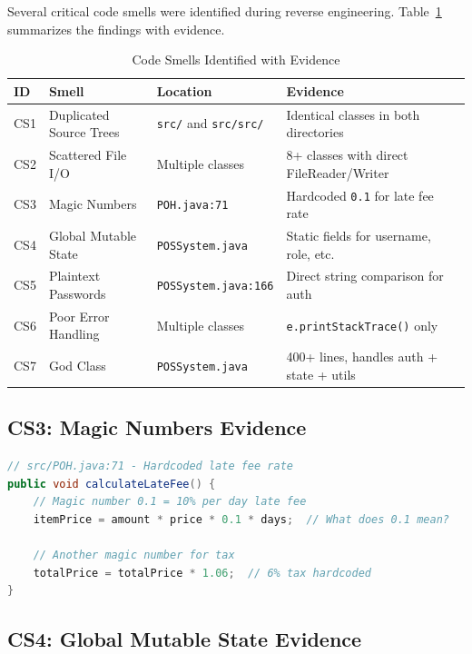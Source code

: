Several critical code smells were identified during reverse engineering.
Table~\ref{tab:code-smells} summarizes the findings with evidence.

\begin{table}[h]
  \centering
  \caption{Code Smells Identified with Evidence}
  \label{tab:code-smells}
  \begin{tabular}{p{1cm} p{3.5cm} p{4cm} p{4.5cm}}
    \toprule
    \textbf{ID} & \textbf{Smell} & \textbf{Location} & \textbf{Evidence} \\
    \midrule
    CS1 & Duplicated Source Trees & \texttt{src/} and \texttt{src/src/} & Identical classes in both directories \\
    CS2 & Scattered File I/O & Multiple classes & 8+ classes with direct FileReader/Writer \\
    CS3 & Magic Numbers & \texttt{POH.java:71} & Hardcoded \texttt{0.1} for late fee rate \\
    CS4 & Global Mutable State & \texttt{POSSystem.java} & Static fields for username, role, etc. \\
    CS5 & Plaintext Passwords & \texttt{POSSystem.java:166} & Direct string comparison for auth \\
    CS6 & Poor Error Handling & Multiple classes & \texttt{e.printStackTrace()} only \\
    CS7 & God Class & \texttt{POSSystem.java} & 400+ lines, handles auth + state + utils \\
    \bottomrule
  \end{tabular}
\end{table}

\subsection{CS3: Magic Numbers Evidence}

\begin{lstlisting}[language=Java]
// src/POH.java:71 - Hardcoded late fee rate
public void calculateLateFee() {
    // Magic number 0.1 = 10% per day late fee
    itemPrice = amount * price * 0.1 * days;  // What does 0.1 mean?
    
    // Another magic number for tax
    totalPrice = totalPrice * 1.06;  // 6% tax hardcoded
}
\end{lstlisting}

\subsection{CS4: Global Mutable State Evidence}

